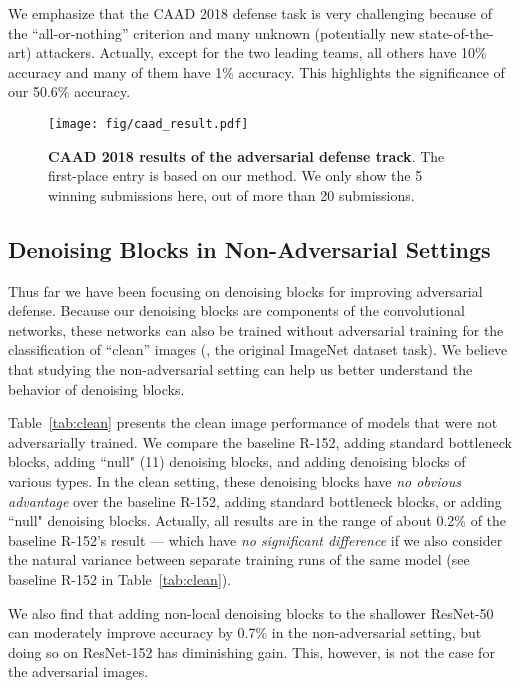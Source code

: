 \documentclass[10pt,twocolumn,letterpaper]{article}
\begin{document}
We emphasize that the CAAD 2018 defense task is very challenging because of the ``all-or-nothing'' criterion and many unknown (potentially new state-of-the-art) attackers. Actually, except for the two leading teams, all others have 10\% accuracy and many of them have 1\% accuracy. This highlights the significance of our 50.6\% accuracy.

\begin{figure}[t]
\centering
\texttt{[image: fig/caad\_result.pdf]}
\caption{\textbf{CAAD 2018 results of the adversarial defense track}.
The first-place entry is based on our method. We only show the 5 winning submissions here, out of more than 20 submissions.}
\label{fig:caad2018}
\vspace{-1.5em}
\end{figure}


\subsection{Denoising Blocks in Non-Adversarial Settings}

Thus far we have been focusing on denoising blocks for improving adversarial defense. Because our denoising blocks are components of the convolutional networks, these networks can also be trained without adversarial training for the classification of ``clean'' images (\ie, the original ImageNet dataset task). We believe that studying the non-adversarial setting can help us better understand the behavior of denoising blocks.

Table~\ref{tab:clean} presents the clean image performance of models that were not adversarially trained. We compare the baseline R-152, adding standard bottleneck blocks, adding ``null" (11) denoising blocks, and adding denoising blocks of various types. In the clean setting, these denoising blocks have \emph{no obvious advantage} over the baseline R-152, adding standard bottleneck blocks, or adding ``null" denoising blocks. Actually, all results are in the range of about 0.2\% of the baseline R-152's result --- which have \emph{no significant difference} if we also consider the natural variance between separate training runs of the same model (see baseline R-152 in Table~\ref{tab:clean}).

We also find that adding non-local denoising blocks to the shallower ResNet-50 can moderately improve accuracy by 0.7\% in the non-adversarial setting, but doing so on ResNet-152 has diminishing gain. This, however, is not the case for the adversarial images.
\end{document}
